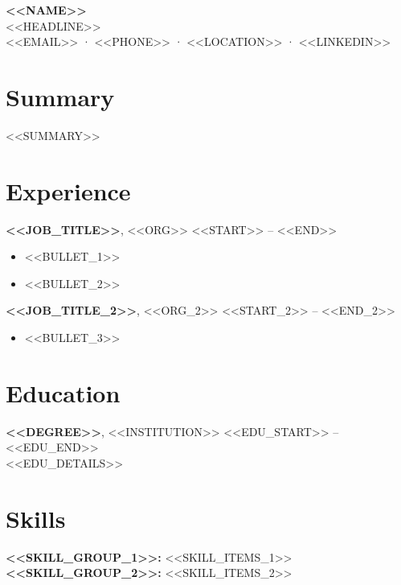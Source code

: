 \documentclass[11pt,a4paper]{article}
\begin{document}
\begin{center}
{\LARGE \textbf{<<NAME>>}}\\[2pt]
{\large <<HEADLINE>>}\\[2pt]
<<EMAIL>> · <<PHONE>> · <<LOCATION>> · <<LINKEDIN>>
\end{center}

\section*{Summary}
<<SUMMARY>>

\section*{Experience}
\textbf{<<JOB_TITLE>>}, <<ORG>> \hfill <<START>> -- <<END>>\\
\begin{itemize}
\item <<BULLET_1>>
\item <<BULLET_2>>
\end{itemize}
\textbf{<<JOB_TITLE_2>>}, <<ORG_2>> \hfill <<START_2>> -- <<END_2>>\\
\begin{itemize}
\item <<BULLET_3>>
\end{itemize}

\section*{Education}
\textbf{<<DEGREE>>}, <<INSTITUTION>> \hfill <<EDU_START>> -- <<EDU_END>>\\
<<EDU_DETAILS>>\\

\section*{Skills}
\textbf{<<SKILL_GROUP_1>>:} <<SKILL_ITEMS_1>>\\
\textbf{<<SKILL_GROUP_2>>:} <<SKILL_ITEMS_2>>\\
\end{document}
